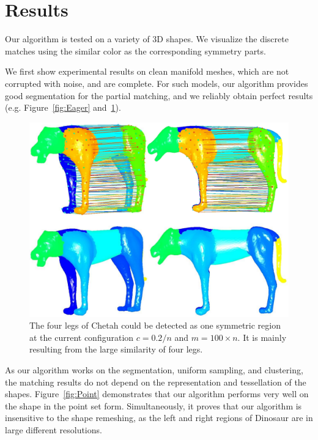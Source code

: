 \section{Results}
\label{sec:result}

Our algorithm is tested on a variety of 3D shapes. 
We visualize the discrete matches using the similar color as the corresponding symmetry parts.

We first show experimental results on clean manifold meshes, which are not corrupted with noise, and are complete. 
For such models, our algorithm provides good segmentation for the partial matching, and we reliably obtain perfect results (e.g. Figure~\ref{fig:Eager} and~\ref{fig:Tiger}). 

\begin{figure}[t]
\centering
  \includegraphics[width=0.99\linewidth]{figures/chetah.pdf}
  \caption{The four legs of Chetah could be detected as one symmetric region at the current configuration $c=0.2/n$ and $m=100 \times n$.
  It is mainly resulting from the large similarity of four legs.}
\label{fig:Tiger}
\end{figure}

As our algorithm works on the segmentation, uniform sampling, and clustering, the matching results do not depend on the representation and tessellation of the shapes.
Figure~\ref{fig:Point} demonstrates that our algorithm performs very well on the shape in the point set form. 
Simultaneously, it proves that our algorithm is insensitive to the shape remeshing, as the left and right regions of Dinosaur are in large different resolutions. 

